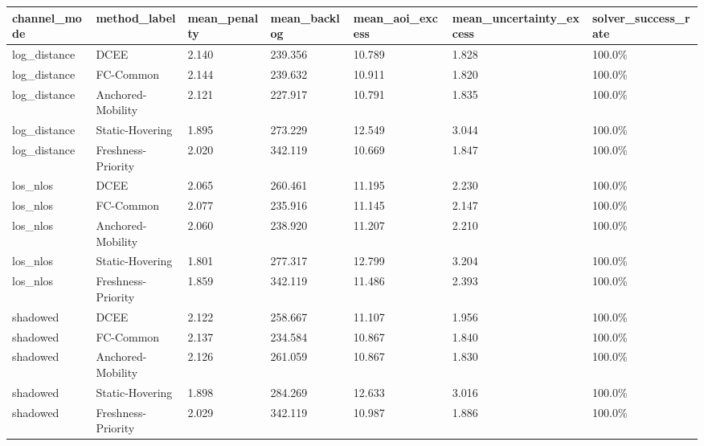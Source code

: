 \begin{tabular}{lllllll}
\toprule
channel_mode & method_label & mean_penalty & mean_backlog & mean_aoi_excess & mean_uncertainty_excess & solver_success_rate \\
\midrule
log_distance & DCEE & 2.140 & 239.356 & 10.789 & 1.828 & 100.0\% \\
log_distance & FC-Common & 2.144 & 239.632 & 10.911 & 1.820 & 100.0\% \\
log_distance & Anchored-Mobility & 2.121 & 227.917 & 10.791 & 1.835 & 100.0\% \\
log_distance & Static-Hovering & 1.895 & 273.229 & 12.549 & 3.044 & 100.0\% \\
log_distance & Freshness-Priority & 2.020 & 342.119 & 10.669 & 1.847 & 100.0\% \\
los_nlos & DCEE & 2.065 & 260.461 & 11.195 & 2.230 & 100.0\% \\
los_nlos & FC-Common & 2.077 & 235.916 & 11.145 & 2.147 & 100.0\% \\
los_nlos & Anchored-Mobility & 2.060 & 238.920 & 11.207 & 2.210 & 100.0\% \\
los_nlos & Static-Hovering & 1.801 & 277.317 & 12.799 & 3.204 & 100.0\% \\
los_nlos & Freshness-Priority & 1.859 & 342.119 & 11.486 & 2.393 & 100.0\% \\
shadowed & DCEE & 2.122 & 258.667 & 11.107 & 1.956 & 100.0\% \\
shadowed & FC-Common & 2.137 & 234.584 & 10.867 & 1.840 & 100.0\% \\
shadowed & Anchored-Mobility & 2.126 & 261.059 & 10.867 & 1.830 & 100.0\% \\
shadowed & Static-Hovering & 1.898 & 284.269 & 12.633 & 3.016 & 100.0\% \\
shadowed & Freshness-Priority & 2.029 & 342.119 & 10.987 & 1.886 & 100.0\% \\
\bottomrule
\end{tabular}
